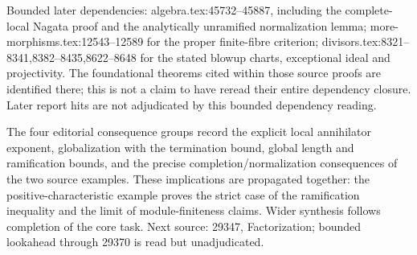 Bounded later dependencies: algebra.tex:45732--45887, including the complete-local Nagata proof and the analytically unramified normalization lemma; more-morphisms.tex:12543--12589 for the proper finite-fibre criterion; divisors.tex:8321--8341,8382--8435,8622--8648 for the stated blowup charts, exceptional ideal and projectivity. The foundational theorems cited within those source proofs are identified there; this is not a claim to have reread their entire dependency closure. Later report hits are not adjudicated by this bounded dependency reading.

The four editorial consequence groups record the explicit local annihilator exponent, globalization with the termination bound, global length and ramification bounds, and the precise completion/normalization consequences of the two source examples. These implications are propagated together: the positive-characteristic example proves the strict case of the ramification inequality and the limit of module-finiteness claims. Wider synthesis follows completion of the core task. Next source: 29347, Factorization; bounded lookahead through 29370 is read but unadjudicated.
